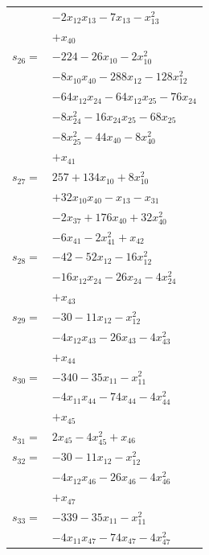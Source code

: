 \begin{longtable}{@{}r@{\;}l@{}}
 & \(\displaystyle -2x_{12}x_{13} -7x_{13} -x_{13}^{2}\) \\
 & \(\displaystyle +x_{40}\) \\[3pt]
\(s_{26}=\) & \(\displaystyle -224 -26x_{10} -2x_{10}^{2}\) \\
 & \(\displaystyle -8x_{10}x_{40} -288x_{12} -128x_{12}^{2}\) \\
 & \(\displaystyle -64x_{12}x_{24} -64x_{12}x_{25} -76x_{24}\) \\
 & \(\displaystyle -8x_{24}^{2} -16x_{24}x_{25} -68x_{25}\) \\
 & \(\displaystyle -8x_{25}^{2} -44x_{40} -8x_{40}^{2}\) \\
 & \(\displaystyle +x_{41}\) \\[3pt]
\(s_{27}=\) & \(\displaystyle 257 +134x_{10} +8x_{10}^{2}\) \\
 & \(\displaystyle +32x_{10}x_{40} -x_{13} -x_{31}\) \\
 & \(\displaystyle -2x_{37} +176x_{40} +32x_{40}^{2}\) \\
 & \(\displaystyle -6x_{41} -2x_{41}^{2} +x_{42}\) \\[3pt]
\(s_{28}=\) & \(\displaystyle -42 -52x_{12} -16x_{12}^{2}\) \\
 & \(\displaystyle -16x_{12}x_{24} -26x_{24} -4x_{24}^{2}\) \\
 & \(\displaystyle +x_{43}\) \\[3pt]
\(s_{29}=\) & \(\displaystyle -30 -11x_{12} -x_{12}^{2}\) \\
 & \(\displaystyle -4x_{12}x_{43} -26x_{43} -4x_{43}^{2}\) \\
 & \(\displaystyle +x_{44}\) \\[3pt]
\(s_{30}=\) & \(\displaystyle -340 -35x_{11} -x_{11}^{2}\) \\
 & \(\displaystyle -4x_{11}x_{44} -74x_{44} -4x_{44}^{2}\) \\
 & \(\displaystyle +x_{45}\) \\[3pt]
\(s_{31}=\) & \(\displaystyle 2x_{45} -4x_{45}^{2} +x_{46}\) \\[3pt]
\(s_{32}=\) & \(\displaystyle -30 -11x_{12} -x_{12}^{2}\) \\
 & \(\displaystyle -4x_{12}x_{46} -26x_{46} -4x_{46}^{2}\) \\
 & \(\displaystyle +x_{47}\) \\[3pt]
\(s_{33}=\) & \(\displaystyle -339 -35x_{11} -x_{11}^{2}\) \\
 & \(\displaystyle -4x_{11}x_{47} -74x_{47} -4x_{47}^{2}\) \\

\end{longtable}
